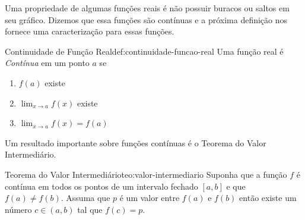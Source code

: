 Uma propriedade de algumas funções reais é não possuir buracos ou saltos em seu
gráfico. Dizemos que essa funções são contínuas e a próxima definição nos fornece
uma caracterização para essas funções.

\begin{definicao}{Continuidade de Função Real}{def:continuidade-funcao-real}
  Uma função real é \emph{Contínua} em um ponto $a$ se
  \begin{enumerate}[parsep=9pt]
    \item \( f(a) \) existe
    \item \( \lim_{x\to a} f(x) \) existe
    \item \( \lim_{x\to a} f(x) = f(a) \)
  \end{enumerate}
\end{definicao}

Um resultado importante sobre funções contínuas é o Teorema do Valor Intermediário.

\begin{teorema}{Teorema do Valor Intermediário}{teo:valor-intermediario}
  Suponha
  que a função $f$ é contínua em todos os pontos de um intervalo fechado
  $[a, b]$ e que \(f(a)\neq f(b)\). Assuma que $p$ é um valor entre $f(a)$ e $f(b)$
  então existe um número $c\in(a, b)$ tal que $f(c)=p$.
\end{teorema}


